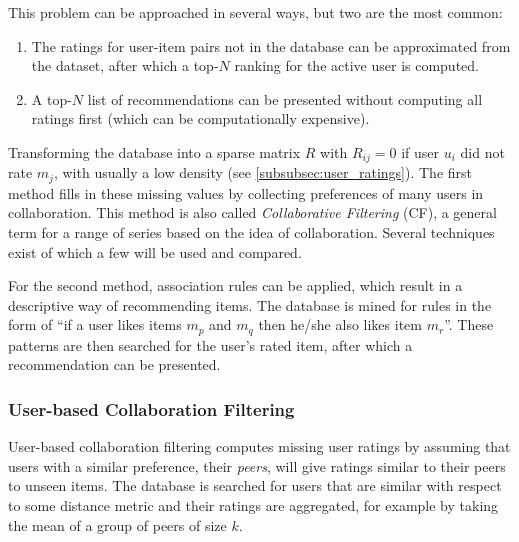 This problem can be approached in several ways, but two are the most common:

\begin{enumerate}
	\item The ratings for user-item pairs not in the database can be approximated from the dataset, after which a top-$N$ ranking for the active user is computed.
	\item A top-$N$ list of recommendations can be presented without computing all ratings first (which can be computationally expensive).
\end{enumerate}

Transforming the database into a sparse matrix $R$ with $R_{ij}=0$ if user $u_i$ did not rate $m_j$, with usually a low density (see \cref{subsubsec:user_ratings}).
The first method fills in these missing values by collecting preferences of many users in collaboration.
This method is also called \emph{Collaborative Filtering} (CF), a general term for a range of series based on the idea of collaboration.
Several techniques exist of which a few will be used and compared.

For the second method, association rules can be applied, which result in a descriptive way of recommending items.
The database is mined for rules in the form of ``if a user likes items $m_p$ and $m_q$ then he/she also likes item $m_r$''.
These patterns are then searched for the user's rated item, after which a recommendation can be presented.




\subsubsection{User-based Collaboration Filtering}

User-based collaboration filtering computes missing user ratings by assuming that users with a similar preference, their \emph{peers}, will give ratings similar to their peers to unseen items.
The database is searched for users that are similar with respect to some distance metric and their ratings are aggregated, for example by taking the mean of a group of peers of size $k$.

